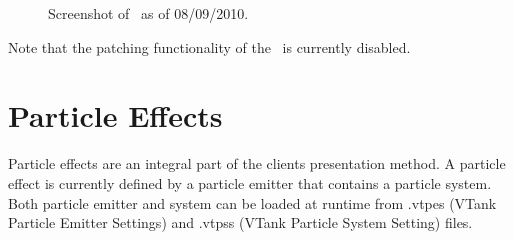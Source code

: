 \begin{figure}[htbp]
	\center
	\caption{Screenshot of \Patcher\ as of 08/09/2010.}
	\label{fig:launcher}
\end{figure}

Note that the patching functionality of the \Patcher\ is currently disabled.

\section{Particle Effects}

Particle effects are an integral part of the clients presentation method. A particle effect is currently defined by a particle emitter that contains a particle system. Both particle emitter and system can be loaded at runtime from .vtpes (VTank Particle Emitter Settings) and .vtpss (VTank Particle System Setting) files.

